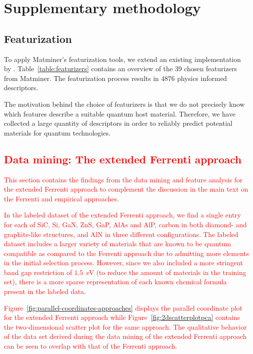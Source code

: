 \documentclass[superscriptaddress,unsortedaddress,
 amsmath,amssymb,
 aps,
]{revtex4-2}
\newcommand{\mrk}[1]{\textcolor{red}{#1}}
\begin{document}
\newpage 

\section*{Supplementary methodology}
\subsection*{Featurization}
To apply Matminer's featurization tools, we extend an existing implementation by \citeauthor{Breuck2021} \cite{Breuck2021}. 
Table~\ref{table:featurizers} contains an overview of the 39  chosen featurizers from Matminer. The featurization process results in $4876$ physics informed descriptors. 

The motivation behind the choice of featurizers is that we do not precisely know which features describe a suitable quantum host material.  Therefore, we have collected a large quantity of descriptors in order to reliably  predict potential materials for quantum technologies. 




\subsection*{\mrk{Data mining: The extended Ferrenti approach}} 

\mrk{This section contains the findings from the data mining and feature analysis for the extended Ferrenti approach to complement the discussion in the main text on the Ferrenti and empirical approaches.}  

\mrk{In the labeled dataset of the extended Ferrenti approach, we find a single entry for each of SiC, Si, GaN, ZnS, GaP, AlAs and AlP, carbon in both diamond- and graphite-like structures, and AlN in three different configurations. The labeled dataset includes a larger variety of materials that are known to be quantum compatible as compared to the Ferrenti approach due to admitting more elements in the initial selection process. However, since we also included a more stringent band gap restriction of $1.5$~eV (to reduce the amount of materials in the training set), there is a more sparse representation of each known chemical formula present in the labeled data. }

\mrk{Figure~\ref{fig:parallel-coordinates-approaches} displays the parallel coordinate plot for the extended Ferrenti approach while Figure~\ref{fig:2dscatterplotpca} contains the two-dimensional scatter plot for the same approach. The qualitative behavior of the data set derived during the data mining of the extended Ferrenti approach can be seen to overlap with that of the Ferrenti approach. }
\end{document}
